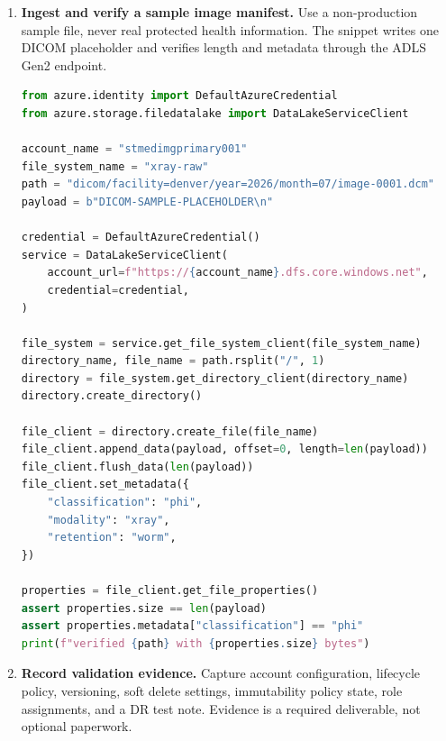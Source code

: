 \begin{enumerate}
\begin{lstlisting}[language=bash,caption={Applying lifecycle, immutable retention, legal hold, and object replication.},label={lst:ch1-capstone-policy-cli}]
az storage container legal-hold set `
  --account-name $primary `
  --container-name $container `
  --tags "regulatory-review" `
  --auth-mode login

az storage account or-policy create `
  --resource-group $rg `
  --account-name $secondary `
  --source-account $primary `
  --destination-account $secondary `
  --rules .\object-replication-rules.json
\end{lstlisting}

    \item \textbf{Ingest and verify a sample image manifest.} Use a non-production sample file, never real protected health information. The snippet writes one DICOM placeholder and verifies length and metadata through the ADLS Gen2 endpoint.
\begin{lstlisting}[language=Python,caption={Ingesting and verifying a sample object with azure-storage-file-datalake.},label={lst:ch1-capstone-python-ingest}]
from azure.identity import DefaultAzureCredential
from azure.storage.filedatalake import DataLakeServiceClient

account_name = "stmedimgprimary001"
file_system_name = "xray-raw"
path = "dicom/facility=denver/year=2026/month=07/image-0001.dcm"
payload = b"DICOM-SAMPLE-PLACEHOLDER\n"

credential = DefaultAzureCredential()
service = DataLakeServiceClient(
    account_url=f"https://{account_name}.dfs.core.windows.net",
    credential=credential,
)

file_system = service.get_file_system_client(file_system_name)
directory_name, file_name = path.rsplit("/", 1)
directory = file_system.get_directory_client(directory_name)
directory.create_directory()

file_client = directory.create_file(file_name)
file_client.append_data(payload, offset=0, length=len(payload))
file_client.flush_data(len(payload))
file_client.set_metadata({
    "classification": "phi",
    "modality": "xray",
    "retention": "worm",
})

properties = file_client.get_file_properties()
assert properties.size == len(payload)
assert properties.metadata["classification"] == "phi"
print(f"verified {path} with {properties.size} bytes")
\end{lstlisting}

    \item \textbf{Record validation evidence.} Capture account configuration, lifecycle policy, versioning, soft delete settings, immutability policy state, role assignments, and a DR test note. Evidence is a required deliverable, not optional paperwork.
\end{enumerate}

